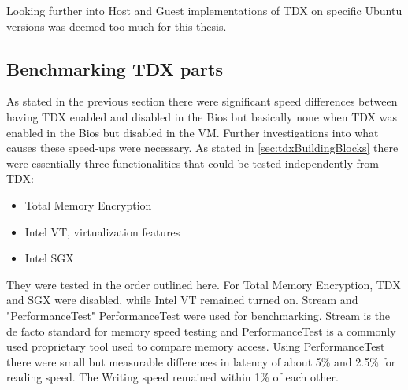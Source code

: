 Looking further into Host and Guest implementations of TDX on specific Ubuntu versions was deemed too much for this thesis.

\subsection{Benchmarking TDX parts}

As stated in the previous section there were significant speed differences between having TDX enabled and disabled in the Bios but basically none when TDX was enabled in the Bios but disabled in the VM. Further investigations into what causes these speed-ups were necessary. As stated in \ref{sec:tdxBuildingBlocks} there were essentially three functionalities that could be tested independently from TDX:
\begin{itemize}
    \item Total Memory Encryption 
    \item Intel VT, virtualization features
    \item Intel SGX
\end{itemize}

They were tested in the order outlined here.
For Total Memory Encryption, TDX and SGX were disabled, while Intel VT remained turned on. Stream \cite{Stream} and "PerformanceTest" \url{PerformanceTest} were used for benchmarking. Stream is the de facto standard for memory speed testing and PerformanceTest is a commonly used proprietary tool used to compare memory access. Using PerformanceTest there were small but measurable differences in latency of about 5\% and 2.5\% for reading speed. The Writing speed remained within 1\% of each other.
\begin{table}
\centering
{}
\caption{Results of Performancetests memory benchmark}
\label{tab:MemoryAccessSpeed}
\end{table}

